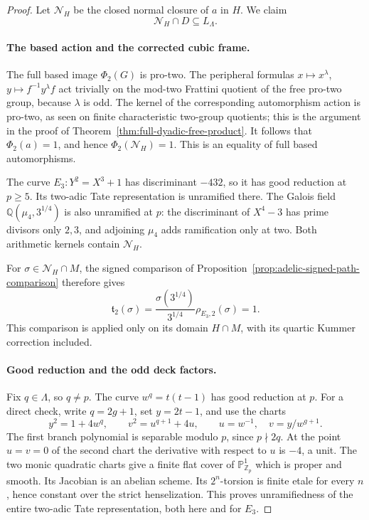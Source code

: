 \begin{proof}
Let \(\mathscr N_H\) be the closed normal closure of
\(a\) in \(H\).
We claim
\begin{equation}
                       \mathscr N_H\cap D\subseteq L_\Lambda.
 \label{eq:general-cm-arithmetic-kernel-comparison}
\end{equation}

\paragraph{The based action and the corrected cubic frame.}
The full based image \(\Phi_2(G)\) is pro-two.
The peripheral formulas
\(x\mapsto x^\lambda\), \(y\mapsto f^{-1}y^\lambda f\)
act trivially on the mod-two Frattini quotient of
the free pro-two group, because \(\lambda\) is odd.
The kernel of the corresponding automorphism action
is pro-two, as seen on finite characteristic
two-group quotients; this is the argument in the
proof of Theorem~\ref{thm:full-dyadic-free-product}.
It follows that \(\Phi_2(a)=1\), and hence
\(\Phi_2(\mathscr N_H)=1\).
This is an equality of full based automorphisms.

The curve \(E_3:Y^2=X^3+1\) has discriminant \(-432\),
so it has good reduction at \(p\ge5\).
Its two-adic Tate representation is unramified there.
The Galois field
\(\mathbb Q(\mu_4,3^{1/4})\) is also unramified at \(p\):
the discriminant of \(X^4-3\) has prime divisors only
\(2,3\), and adjoining \(\mu_4\) adds ramification
only at two.
Both arithmetic kernels contain \(\mathscr N_H\).

For \(\sigma\in\mathscr N_H\cap M\), the signed comparison
of Proposition~\ref{prop:adelic-signed-path-comparison}
therefore gives
\[
 \mathfrak t_2(\sigma)
   =\frac{\sigma(3^{1/4})}{3^{1/4}}\rho_{E_3,2}(\sigma)=1.
\]
This comparison is applied only on its domain \(H\cap M\),
with its quartic Kummer correction included.

\paragraph{Good reduction and the odd deck factors.}
Fix \(q\in\Lambda\), so \(q\ne p\).
The curve \(w^q=t(t-1)\) has good reduction at \(p\).
For a direct check, write \(q=2g+1\), set \(y=2t-1\),
and use the charts
\[
 y^2=1+4w^q,\qquad
 v^2=u^{q+1}+4u,\qquad
 u=w^{-1},\quad v=y/w^{g+1}.
\]
The first branch polynomial is separable modulo \(p\),
since \(p\nmid2q\).
At the point \(u=v=0\) of the second chart the derivative
with respect to \(u\) is \(-4\), a unit.
The two monic quadratic charts give a finite flat cover
of \(\mathbb P^1_{\mathbb Z_p}\) which is proper and smooth.
Its Jacobian is an abelian scheme.
Its \(2^n\)-torsion is finite etale for every \(n\), hence
constant over the strict henselization.
This proves unramifiedness of the entire two-adic
Tate representation, both here and for \(E_3\).


\end{proof}
